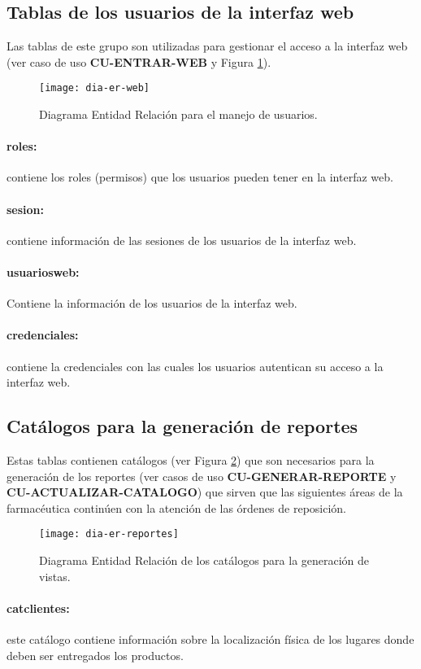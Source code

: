 \subsection{Tablas de los usuarios de la interfaz web}
Las tablas de este grupo son utilizadas para gestionar el acceso a la interfaz web (ver caso de uso \textbf{CU-ENTRAR-WEB} y Figura \ref{fig:dia-er-web}).
\begin{figure}[h]
  \centering
  \texttt{[image: dia-er-web]} 
  \caption{Diagrama Entidad Relación para el manejo de usuarios.}
  \label{fig:dia-er-web}
\end{figure}
\paragraph{roles:} contiene los roles (permisos) que los usuarios pueden tener en la interfaz web.
\paragraph{sesion:} contiene información de las sesiones de los usuarios de la interfaz web.
\paragraph{usuarios{\textunderscore}web:} Contiene la información de los usuarios de la interfaz web.
\paragraph{credenciales:} contiene la credenciales con las cuales los usuarios autentican su acceso a la interfaz web.


\subsection{Catálogos para la generación de reportes}
Estas tablas contienen catálogos (ver Figura \ref{fig:dia-er-reportes}) que son necesarios para la generación de los reportes (ver casos de uso \textbf{CU-GENERAR-REPORTE} y \textbf{CU-ACTUALIZAR-CATALOGO}) que sirven que las siguientes áreas de la farmacéutica continúen con la atención de las órdenes de reposición.
\begin{figure}[h]
  \centering
  \texttt{[image: dia-er-reportes]} 
  \caption{Diagrama Entidad Relación de los catálogos para la generación de vistas.}
  \label{fig:dia-er-reportes}
\end{figure}
\paragraph{cat{\textunderscore}clientes:} este catálogo contiene información sobre la localización física de los lugares donde deben ser entregados los productos.
